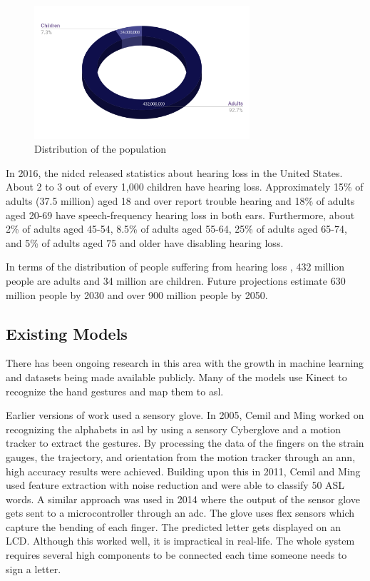 \documentclass[twocolumn]{article}
\begin{document}
\begin{figure}[h]
\centering
\includegraphics[width=8cm]{./figures/distribution of the population}
\caption{Distribution of the population}
\end{figure}

In 2016, the \gls{nidcd} \cite{nidcd} released statistics about hearing loss 
in the United States. About 2 to 3 out of every 1,000 children have hearing 
loss. Approximately 15\% of adults (37.5 million) aged 18 and over report 
trouble hearing and 18\% of adults aged 20-69 have speech-frequency hearing 
loss in both ears. Furthermore, about 2\% of adults aged 45-54, 8.5\% of 
adults aged 55-64, 25\% of adults aged 65-74, and 5\% of adults aged 75 and 
older have disabling hearing loss.

In terms of the distribution of people suffering from hearing loss \cite{who}, 
432 million people are adults and 34 million are children. Future projections 
estimate 630 million people by 2030 and over 900 million people by 2050.

\subsection{Existing Models}

There has been ongoing research in this area with the growth in machine 
learning and datasets being made available publicly. Many of the models use 
Kinect to recognize the hand gestures and map them to \gls{asl}.

Earlier versions of work used a sensory glove. In 2005, Cemil and Ming 
\cite{oz2005recognition} worked on recognizing the alphabets in \gls{asl} by 
using a sensory Cyberglove and a motion tracker to extract the gestures. By 
processing the data of the fingers on the strain gauges, the trajectory, and 
orientation from the motion tracker through an \gls{ann}, high accuracy 
results were achieved. Building upon this in 2011, Cemil and Ming 
\cite{oz2011american} used feature extraction with noise reduction and were 
able to classify 50 ASL words. A similar approach was used in 2014 
\cite{patil2014american} where the output of the sensor glove gets sent to a 
microcontroller through an \gls{adc}. The glove uses flex sensors which 
capture the bending of each finger. The predicted letter gets displayed on an 
LCD. Although this worked well, it is impractical in real-life. The whole 
system requires several high components to be connected each time someone 
needs to sign a letter.
\end{document}

